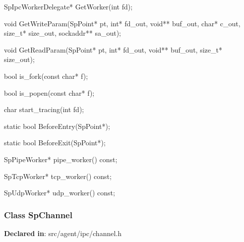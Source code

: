 \begin{apient}
SpIpcWorkerDelegate* GetWorker(int fd);
\end{apient}
\apidesc{
}

\begin{apient}
void GetWriteParam(SpPoint* pt,
                   int* fd_out,
                   void** buf_out,
                   char* c_out,
                   size_t* size_out,
                   sockaddr** sa_out);
\end{apient}
\apidesc{
}

\begin{apient}
void GetReadParam(SpPoint* pt,
                  int* fd_out,
                  void** buf_out,
                  size_t* size_out);
\end{apient}
\apidesc{
}

\begin{apient}
bool is_fork(const char* f);
\end{apient}
\apidesc{
}

\begin{apient}
bool is_popen(const char* f);
\end{apient}
\apidesc{
}

\begin{apient}
char start_tracing(int fd);
\end{apient}
\apidesc{
}

\begin{apient}
static bool BeforeEntry(SpPoint*);
\end{apient}
\apidesc{
}

\begin{apient}
static bool BeforeExit(SpPoint*);
\end{apient}
\apidesc{
}

\begin{apient}
SpPipeWorker* pipe_worker() const;
\end{apient}
\apidesc{
}

\begin{apient}
SpTcpWorker* tcp_worker() const;
\end{apient}
\apidesc{
}

\begin{apient}
SpUdpWorker* udp_worker() const;
\end{apient}
\apidesc{
}

\subsubsection{Class SpChannel}
\textbf{Declared in}: src/agent/ipc/channel.h

